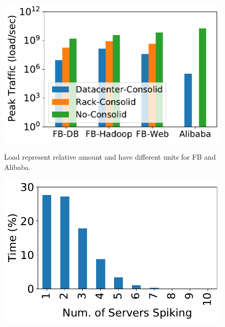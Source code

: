 {
\begin{figure}
\begin{minipage}{0.25\textwidth}
\begin{center}
\centerline{\includegraphics[width=\textwidth]{Figures/fig_fb_alibaba_trace.pdf}}
\vspace{-0.1in}
{
Load represent relative amount and have different units for FB and Alibaba.
}
\end{center}
\end{minipage}
\begin{minipage}{0.25\textwidth}
\begin{center}
\centerline{\includegraphics[width=\textwidth]{Figures/spike-trace-analysis.pdf}}
\vspace{-0.1in}
{
}
\end{center}

\end{minipage}
\end{figure}}
